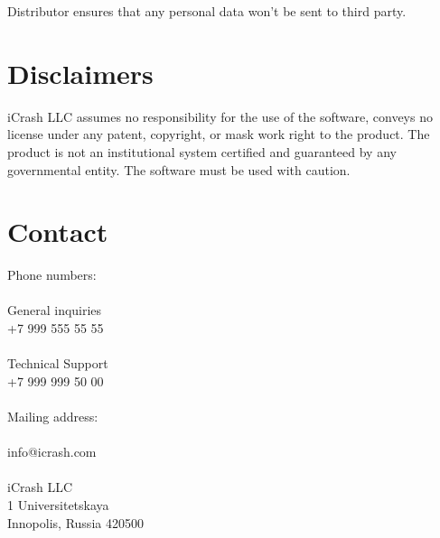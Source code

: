 Distributor ensures that any personal data won't be sent to third party.  


\section{Disclaimers}

iCrash LLC assumes no responsibility for the use of the software, conveys no
license under any patent, copyright, or mask work right to the product.
The product is not an institutional system certified and guaranteed by any
governmental entity.
The software must be used with caution.

\section{Contact}
Phone numbers:\\
\\
General inquiries\\
+7 999 555 55 55\\
\\
Technical Support\\
+7 999 999 50 00\\
\\
Mailing address:\\
\\
info@icrash.com\\
\\
iCrash LLC\\
1 Universitetskaya\\
Innopolis, Russia 420500